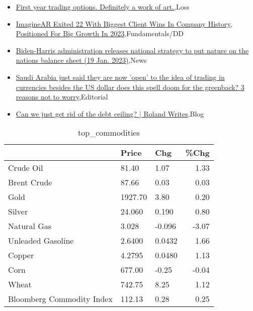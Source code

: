 \documentclass{article}%
\begin{document}
%
\begin{itemize}%
\item%
\href{https://reddit.com/r/wallstreetbets/comments/10hov3u/first\_year\_trading\_options\_definitely\_a\_work\_of/}{First year trading options. Definitely a work of art.},Loss%
\item%
\href{https://reddit.com/r/StockMarket/comments/10hnq9o/imaginear\_exited\_22\_with\_biggest\_client\_wins\_in/}{ImagineAR Exited 22 With Biggest Client Wins In Company History, Positioned For Big Growth In 2023},Fundamentals/DD%
\item%
\href{https://reddit.com/r/Economics/comments/10hio1s/bidenharris\_administration\_releases\_national/}{Biden-Harris administration releases national strategy to put nature on the nations balance sheet (19 Jan. 2023)},News%
\item%
\href{https://reddit.com/r/Economics/comments/10hdjnb/saudi\_arabia\_just\_said\_they\_are\_now\_open\_to\_the/}{Saudi Arabia just said they are now 'open' to the idea of trading in currencies besides the US dollar  does this spell doom for the greenback? 3 reasons not to worry},Editorial%
\item%
\href{https://reddit.com/r/Economics/comments/10h8wjz/can\_we\_just\_get\_rid\_of\_the\_debt\_ceiling\_roland/}{Can we just get rid of the debt ceiling? | Roland Writes},Blog%
\end{itemize}%


\begin{table}[htbp]%
\caption{top\_commodities}%
\centering%
\begin{adjustbox}{width=1\textwidth}%
\begin{tabular}{lllr}
\toprule
                          &   Price &    Chg &  \%Chg \\
\midrule
               Crude Oil  &   81.40 &   1.07 &  1.33 \\
             Brent Crude  &   87.66 &   0.03 &  0.03 \\
                    Gold  & 1927.70 &   3.80 &  0.20 \\
                  Silver  &  24.060 &  0.190 &  0.80 \\
             Natural Gas  &   3.028 & -0.096 & -3.07 \\
       Unleaded Gasoline  &  2.6400 & 0.0432 &  1.66 \\
                  Copper  &  4.2795 & 0.0480 &  1.13 \\
                    Corn  &  677.00 &  -0.25 & -0.04 \\
                   Wheat  &  742.75 &   8.25 &  1.12 \\
Bloomberg Commodity Index &  112.13 &   0.28 &  0.25 \\
\bottomrule
\end{tabular}
%
\end{adjustbox}%
\end{table}
\end{document}
